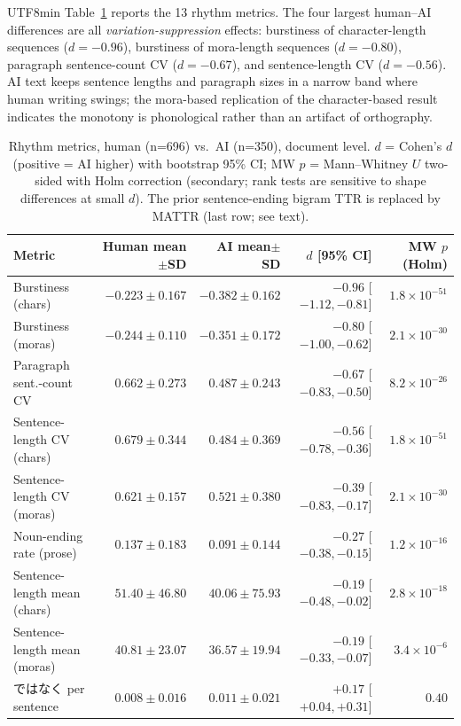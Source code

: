 \documentclass[11pt,a4paper]{article}
\begin{document}
\begin{CJK}{UTF8}{min}
Table~\ref{tab:rhythm} reports the 13 rhythm metrics. The four largest human--AI differences are all \emph{variation-suppression} effects: burstiness of character-length sequences ($d=-0.96$), burstiness of mora-length sequences ($d=-0.80$), paragraph sentence-count CV ($d=-0.67$), and sentence-length CV ($d=-0.56$). AI text keeps sentence lengths and paragraph sizes in a narrow band where human writing swings; the mora-based replication of the character-based result indicates the monotony is phonological rather than an artifact of orthography.

\begin{table}[H]
\centering
\caption{Rhythm metrics, human (n=696) vs.\ AI (n=350), document level. $d$ = Cohen's $d$ (positive = AI higher) with bootstrap 95\% CI; MW $p$ = Mann--Whitney $U$ two-sided with Holm correction (secondary; rank tests are sensitive to shape differences at small $d$). The prior sentence-ending bigram TTR is replaced by MATTR (last row; see text).}
\label{tab:rhythm}
\footnotesize
\setlength{\tabcolsep}{4pt}
\begin{tabular}{lrrrr}
\toprule
Metric & Human mean$\pm$SD & AI mean$\pm$SD & $d$ [95\% CI] & MW $p$ (Holm) \\
\midrule
Burstiness (chars) & $-0.223 \pm 0.167$ & $-0.382 \pm 0.162$ & $\mathbf{-0.96}$ [$-1.12, -0.81$] & $1.8\times10^{-51}$ \\
Burstiness (moras) & $-0.244 \pm 0.110$ & $-0.351 \pm 0.172$ & $\mathbf{-0.80}$ [$-1.00, -0.62$] & $2.1\times10^{-30}$ \\
Paragraph sent.-count CV & $0.662 \pm 0.273$ & $0.487 \pm 0.243$ & $\mathbf{-0.67}$ [$-0.83, -0.50$] & $8.2\times10^{-26}$ \\
Sentence-length CV (chars) & $0.679 \pm 0.344$ & $0.484 \pm 0.369$ & $-0.56$ [$-0.78, -0.36$] & $1.8\times10^{-51}$ \\
Sentence-length CV (moras) & $0.621 \pm 0.157$ & $0.521 \pm 0.380$ & $-0.39$ [$-0.83, -0.17$] & $2.1\times10^{-30}$ \\
Noun-ending rate (prose) & $0.137 \pm 0.183$ & $0.091 \pm 0.144$ & $-0.27$ [$-0.38, -0.15$] & $1.2\times10^{-16}$ \\
Sentence-length mean (chars) & $51.40 \pm 46.80$ & $40.06 \pm 75.93$ & $-0.19$ [$-0.48, -0.02$] & $2.8\times10^{-18}$ \\
Sentence-length mean (moras) & $40.81 \pm 23.07$ & $36.57 \pm 19.94$ & $-0.19$ [$-0.33, -0.07$] & $3.4\times10^{-6}$ \\
ではなく per sentence & $0.008 \pm 0.016$ & $0.011 \pm 0.021$ & $+0.17$ [$+0.04, +0.31$] & $0.40$ \\

\end{tabular}
\end{table}
\end{CJK}
\end{document}
